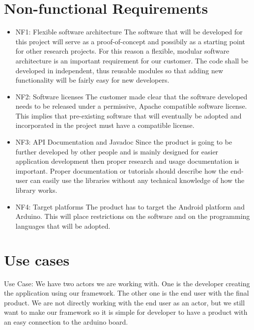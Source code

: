 \section{Non-functional Requirements}

\begin{itemize}
\item{NF1: Flexible software architecture}\newline
The software that will be developed for this project will serve as
a proof-of-concept and possibily as a starting point for other research
projects. For this reason a flexible, modular software architecture
is an important requirement for our customer. The code shall be developed
in independent, thus reusable modules so that adding new functionality
will be fairly easy for new developers.

\item{NF2: Software licenses}\newline
The customer made clear that the software developed needs to be released
under a permissive, Apache compatible software license. This implies
that pre-existing software that will eventually be adopted and incorporated
in the project must have a compatible license.

\item{NF3: API Documentation and Javadoc}\newline
Since the product is going to be further developed by other people and is
mainly designed for easier application development then proper research and usage
documentation is important. Proper documentation or tutorials should describe how
the end-user can easily use the libraries without any technical knowledge of how
the library works.

\item{NF4: Target platforms}\newline
The product has to target the Android platform and Arduino.
This will place restrictions on the software and on the programming languages that will be adopted.
\end{itemize}

\newpage
\section{Use cases}
Use Case:
We have two actors we are working with. One is the developer creating the application using our framework. The other one is the end user with the final product. We are not directly working with the end user as an actor, but we still want to make our framework so it is simple for developer to have a product with an easy connection to the arduino board.

